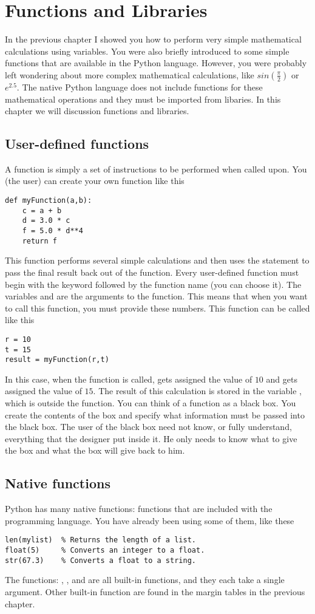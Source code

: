 \chapter{Functions and Libraries}
\label{chap:Functions}

In the previous chapter I showed you how to perform very simple
mathematical calculations using variables.  You were also briefly
introduced to some simple functions that are available in the Python
language.  However, you were probably left wondering about more complex
mathematical calculations, like $sin(\frac{\pi}{2})$ or $e^{2.5}$.
The native Python language does not include functions for these
mathematical operations and they must be imported from libaries.  In
this chapter we will discussion functions and libraries.

\section{User-defined functions}
A function is simply a set of instructions to be performed when called
upon.  You (the user) can create your own function like this
\begin{Verbatim}
def myFunction(a,b):
    c = a + b
    d = 3.0 * c
    f = 5.0 * d**4
    return f
\end{Verbatim}
This function performs several simple calculations and then uses the
 statement to pass the final result back out of the
function.  Every user-defined function must begin with the keyword
 followed by the function name (you can choose it). The
variables  and  are the arguments to the function.
This means that when you want to call this function, you must provide
these numbers.  This function can be called like this
\begin{Verbatim}
r = 10
t = 15
result = myFunction(r,t)
\end{Verbatim}
In this case, when the function is called,  gets assigned
the value of $10$ and  gets assigned the value of $15$.  The
result of this calculation is stored in the variable ,
which is outside the function.  You can think of a function as a black
box. You create the contents of the box and specify what information
must be passed into the black box.  The user of the black box need not
know, or fully understand, everything that the designer put inside
it.  He only needs to know what to give the box and what the box will
give back to him.

\section{Native functions}
Python has many native functions: functions that are included with the
programming language.  You have already been using some of them, like these
\begin{Verbatim}
len(mylist)  % Returns the length of a list.
float(5)     % Converts an integer to a float.
str(67.3)    % Converts a float to a string.
\end{Verbatim}
The functions: , , and  are all
built-in functions, and they each take a single argument.  Other
built-in function are found in the margin tables in the previous chapter.

